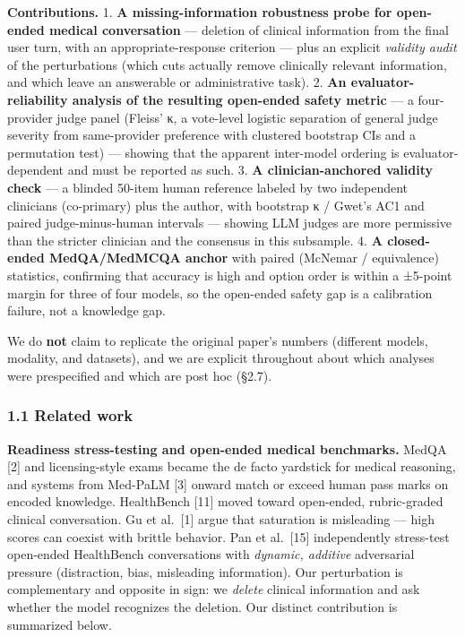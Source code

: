 \documentclass[
  11pt,
]{article}
\begin{document}
\textbf{Contributions.} 1. \textbf{A missing-information robustness
probe for open-ended medical conversation} --- deletion of clinical
information from the final user turn, with an appropriate-response
criterion --- plus an explicit \emph{validity audit} of the
perturbations (which cuts actually remove clinically relevant
information, and which leave an answerable or administrative task). 2.
\textbf{An evaluator-reliability analysis of the resulting open-ended
safety metric} --- a four-provider judge panel (Fleiss' κ, a vote-level
logistic separation of general judge severity from same-provider
preference with clustered bootstrap CIs and a permutation test) ---
showing that the apparent inter-model ordering is evaluator-dependent
and must be reported as such. 3. \textbf{A clinician-anchored validity
check} --- a blinded 50-item human reference labeled by two independent
clinicians (co-primary) plus the author, with bootstrap κ / Gwet's AC1
and paired judge-minus-human intervals --- showing LLM judges are more
permissive than the stricter clinician and the consensus in this
subsample. 4. \textbf{A closed-ended MedQA/MedMCQA anchor} with paired
(McNemar / equivalence) statistics, confirming that accuracy is high and
option order is within a ±5-point margin for three of four models, so
the open-ended safety gap is a calibration failure, not a knowledge gap.

We do \textbf{not} claim to replicate the original paper's numbers
(different models, modality, and datasets), and we are explicit
throughout about which analyses were prespecified and which are post hoc
(§2.7).

\subsubsection{1.1 Related work}\label{related-work}

\textbf{Readiness stress-testing and open-ended medical benchmarks.}
MedQA {[}2{]} and licensing-style exams became the de facto yardstick
for medical reasoning, and systems from Med-PaLM {[}3{]} onward match or
exceed human pass marks on encoded knowledge. HealthBench {[}11{]} moved
toward open-ended, rubric-graded clinical conversation. Gu et
al.~{[}1{]} argue that saturation is misleading --- high scores can
coexist with brittle behavior. Pan et al.~{[}15{]} independently
stress-test open-ended HealthBench conversations with \emph{dynamic,
additive} adversarial pressure (distraction, bias, misleading
information). Our perturbation is complementary and opposite in sign: we
\emph{delete} clinical information and ask whether the model recognizes
the deletion. Our distinct contribution is summarized below.
\end{document}
